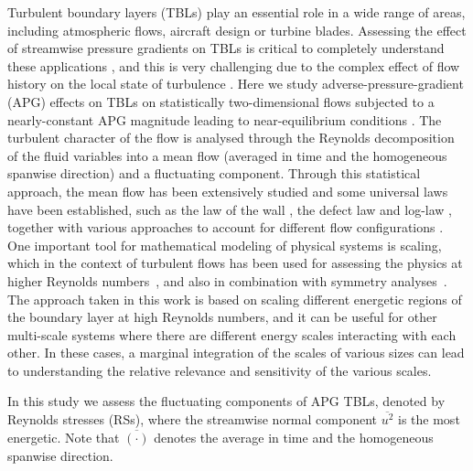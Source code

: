 
Turbulent boundary layers (TBLs) play an essential role in a wide range of areas, including atmospheric flows, aircraft design or turbine blades. Assessing the effect of streamwise pressure gradients on TBLs is critical to completely understand these applications \cite{harun_monty2013, Maciel_2018}, and this is very challenging due to the complex effect of flow history on the local state of turbulence \cite{bobke2017, tanarro_2020, Kitsios2017}. Here we study adverse-pressure-gradient (APG) effects on TBLs on statistically two-dimensional flows subjected to a nearly-constant APG magnitude leading to near-equilibrium conditions \cite{Marusic_McKeon_2010, Nagib_2008}.
The turbulent character of the flow is analysed through the Reynolds decomposition \cite{Rey_decomp} of the fluid variables into a mean flow (averaged in time and the homogeneous spanwise direction) and a fluctuating component.
Through this statistical approach, the mean flow has been extensively studied and some universal laws have been established, such as the law of the wall \cite{vonKarman1931}, the defect law and log-law  \cite{millikan39}, together with various approaches to account for different flow configurations \cite{Luchini_2017}. 
One important tool for mathematical modeling of physical systems is scaling, which in the context of turbulent flows has been used for assessing the physics at higher Reynolds numbers~\cite{Hultmark_2012}, and also in combination with symmetry analyses~\cite{Oberlack_2022}.
The approach taken in this work is based on scaling different energetic regions of the boundary layer at high Reynolds numbers, and it can be useful for other multi-scale systems where there are different energy scales interacting with each other. In these cases, a marginal integration of the scales of various sizes can lead to understanding the relative relevance and sensitivity of the various scales.

In this study we assess the fluctuating components of APG TBLs, denoted by Reynolds stresses (RSs), where the streamwise normal component $\overline{u^2}$ is the most energetic. Note that $\overline{(\cdot)}$ denotes the average in time and the homogeneous spanwise direction.

